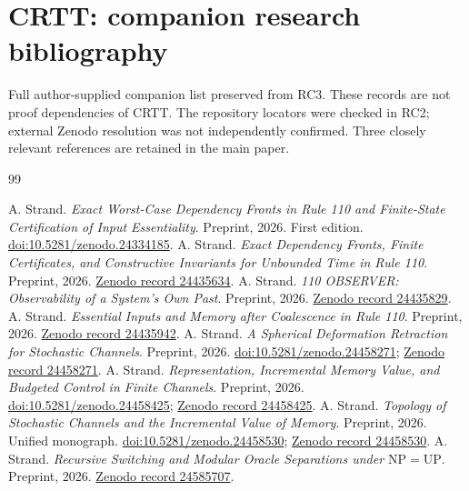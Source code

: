 \documentclass[10pt]{article}
\begin{document}
\section*{CRTT: companion research bibliography}
Full author-supplied companion list preserved from RC3. These records are not proof dependencies of CRTT. The repository locators were checked in RC2; external Zenodo resolution was not independently confirmed. Three closely relevant references are retained in the main paper.
\begin{thebibliography}{99}
\raggedright
{} A. Strand. \emph{Exact Worst-Case Dependency Fronts in Rule 110 and Finite-State Certification of Input Essentiality}. Preprint, 2026. First edition. \href{https://doi.org/10.5281/zenodo.24334185}{doi:10.5281/zenodo.24334185}.
 A. Strand. \emph{Exact Dependency Fronts, Finite Certificates, and Constructive Invariants for Unbounded Time in Rule 110}. Preprint, 2026. \href{https://zenodo.org/records/24435634}{Zenodo record 24435634}.
 A. Strand. \emph{110 OBSERVER: Observability of a System's Own Past}. Preprint, 2026. \href{https://zenodo.org/records/24435829}{Zenodo record 24435829}.
 A. Strand. \emph{Essential Inputs and Memory after Coalescence in Rule 110}. Preprint, 2026. \href{https://zenodo.org/records/24435942}{Zenodo record 24435942}.
 A. Strand. \emph{A Spherical Deformation Retraction for Stochastic Channels}. Preprint, 2026. \href{https://doi.org/10.5281/zenodo.24458271}{doi:10.5281/zenodo.24458271}; \href{https://zenodo.org/records/24458271}{Zenodo record 24458271}.
 A. Strand. \emph{Representation, Incremental Memory Value, and Budgeted Control in Finite Channels}. Preprint, 2026. \href{https://doi.org/10.5281/zenodo.24458425}{doi:10.5281/zenodo.24458425}; \href{https://zenodo.org/records/24458425}{Zenodo record 24458425}.
 A. Strand. \emph{Topology of Stochastic Channels and the Incremental Value of Memory}. Preprint, 2026. Unified monograph. \href{https://doi.org/10.5281/zenodo.24458530}{doi:10.5281/zenodo.24458530}; \href{https://zenodo.org/records/24458530}{Zenodo record 24458530}.
 A. Strand. \emph{Recursive Switching and Modular Oracle Separations under $\mathrm{NP}=\mathrm{UP}$}. Preprint, 2026. \href{https://zenodo.org/records/24585707}{Zenodo record 24585707}.
\end{thebibliography}
\end{document}
